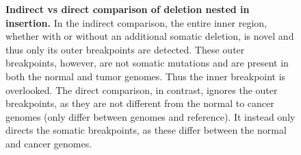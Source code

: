 \documentclass{easychithesis}
\begin{document}
\begin{figure}[ht]
\centering
{}
\quad
{}
%
\caption{{\bf Indirect vs direct comparison of deletion nested in insertion.} In the indirect comparison, the entire inner region, whether with or without an additional somatic deletion, is novel and thus only its outer breakpoints are detected. These outer breakpoints, however, are not somatic mutations and are present in both the normal and tumor genomes. Thus the inner breakpoint is overlooked. The direct comparison, in contrast, ignores the outer breakpoints, as they are not different from the normal to cancer genomes (only differ between genomes and reference). It instead only directs the somatic breakpoints, as these differ between the normal and cancer genomes.}
\label{fig:NestedDeletion}
\end{figure}
\end{document}
